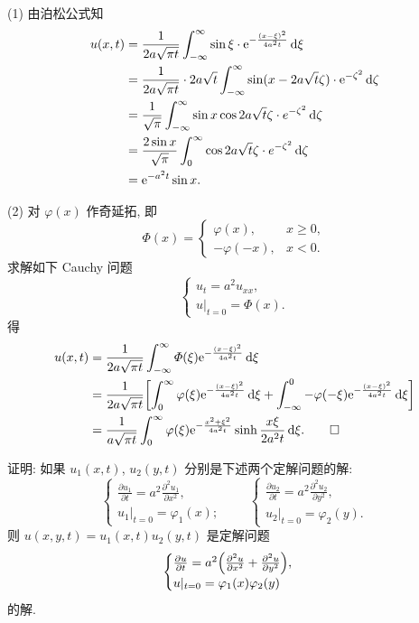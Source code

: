 \begin{solution}
  (1) 由泊松公式知
  \[\begin{split}
    u(x,t)
    & = \frac{1}{2a\sqrt{\pi t}} \int_{-\infty}^{\infty}
        \sin\xi\cdot \mathrm{e}^{-\frac{(x-\xi)^2}{4a^2t}}\mathop{}\!\mathrm{d}\xi \\
    & = \frac{1}{2a\sqrt{\pi t}}\cdot 2a\sqrt{t}\int_{-\infty}^{\infty}
        \sin(x-2a\sqrt{t}\zeta)\cdot \mathrm{e}^{-\zeta^2}\mathop{}\!\mathrm{d}\zeta \\
    & = \frac{1}{\sqrt{\pi}} \int_{-\infty}^{\infty}
        \sin x\cos 2a\sqrt{t}\zeta\cdot e^{-\zeta^2}\mathop{}\!\mathrm{d}\zeta \\
    & = \frac{2\sin x}{\sqrt{\pi}} \int_0^{\infty}
        \cos 2a\sqrt{t}\zeta\cdot e^{-\zeta^2}\mathop{}\!\mathrm{d}\zeta \\
    & = \mathrm{e}^{-a^2t}\sin x.
  \end{split}\]

  (2) 对 $\varphi(x)$ 作奇延拓, 即
  \[\varPhi(x) = \begin{cases}
    \varphi(x),   & x\geq 0, \\
    -\varphi(-x), & x<0.
  \end{cases}\]
  求解如下 Cauchy 问题
  \[\begin{cases}
    u_t = a^2 u_{xx}, \\
    u|_{t=0} = \varPhi(x).
  \end{cases}\]
  得
  \begin{align*}
    u(x,t)
    & = \frac{1}{2a\sqrt{\pi t}} \int_{-\infty}^{\infty}
        \varPhi(\xi) \mathrm{e}^{-\frac{(x-\xi)^2}{4a^2t}} \mathop{}\!\mathrm{d}\xi \\
    & = \frac{1}{2a\sqrt{\pi t}} \biggl[
        \int_0^{\infty} \varphi(\xi) \mathrm{e}^{-\frac{(x-\xi)^2}{4a^2t}} \mathop{}\!\mathrm{d}\xi
        + \int_{-\infty}^0 -\varphi(-\xi) \mathrm{e}^{-\frac{(x-\xi)^2}{4a^2t}}\mathop{}\!\mathrm{d}\xi\biggr] \\
    & = \frac{1}{a\sqrt{\pi t}} \int_0^{\infty} \varphi(\xi)
        \mathrm{e}^{-\frac{x^2+\xi^2}{4a^2 t}}\sinh \frac{x\xi}{2a^2 t}\mathop{}\!\mathrm{d}\xi. \qedhere
  \end{align*}
\end{solution}


\begin{exercise}[7]
  证明: 如果 $u_1(x,t)$, $u_2(y,t)$ 分别是下述两个定解问题的解:
  \[\begin{cases}
    \frac{\partial u_1}{\partial t} = a^2 \frac{\partial^2u_1}{\partial x^2}, \\
    u_1|_{t=0} = \varphi_1(x);
  \end{cases}
  \qquad
  \begin{cases}
    \frac{\partial u_2}{\partial t} = a^2 \frac{\partial^2u_2}{\partial y^2}, \\
    u_2|_{t=0} = \varphi_2(y).
  \end{cases}\]
  则 $u(x,y,t) = u_1(x,t)u_2(y,t)$ 是定解问题
  \[\begin{cases}
    \frac{\partial u}{\partial t} = 
      a^2\Bigl(\frac{\partial^2u}{\partial x^2} + \frac{\partial^2u}{\partial y^2}\Bigr), \\
    u|_{t=0} = \varphi_1(x) \varphi_2(y)
  \end{cases}\]
  的解.
\end{exercise}

